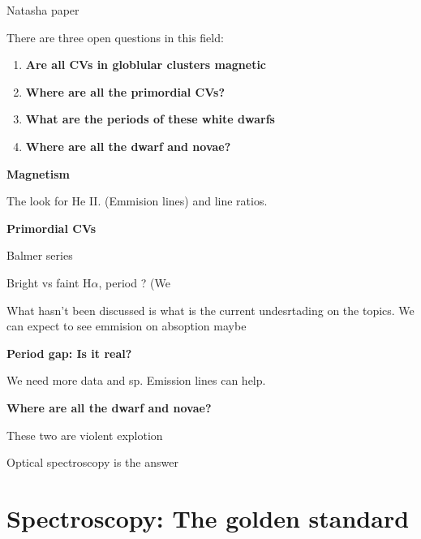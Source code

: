 Natasha paper


There are three open questions in this field:

\begin{enumerate}
        \item \textbf{Are all CVs in globlular clusters magnetic}
        \item \textbf{Where are all the primordial CVs?}
        \item \textbf{What are the periods of these white dwarfs}
        \item \textbf{Where are all the dwarf and novae?}
\end{enumerate}

\textbf{Magnetism}

The look for He II. (Emmision lines) and line ratios. 

\textbf{Primordial CVs}

Balmer series

Bright vs faint H$\alpha$, period ? (We

What hasn't been discussed is what is the current undesrtading on the topics. 
We can expect to see emmision on absoption maybe


\textbf{Period gap: Is it real?}

We need more data and sp. Emission lines can help. 


\textbf{Where are all the dwarf and novae?}

These two are violent explotion


Optical spectroscopy is the answer

\section{Spectroscopy: The golden standard}\label{sec:spec}

  

